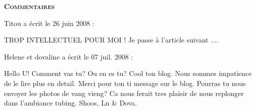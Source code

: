 \bigskip
\textbf{\textsc{Commentaires}}

 \medskip
Titou a écrit le 26 juin 2008 :
\begin{displayquote}
TROP INTELLECTUEL POUR MOI ! 
Je passe à l'article suivant ....
\end{displayquote}

 \medskip
Helene et dovaline a écrit le 07 juil. 2008 :
\begin{displayquote}
Hello U!
Comment vas tu? Ou en es tu?
Cool ton blog. Nous sommes impatience de le lire plus en detail.
Merci pour ton ti message sur le blog. 
Pourras tu nous envoyer les photos de vang vieng? Ca nous ferait tres plaisir de nous replonger dans l'ambiance tubing.
Shoos,
Ln & Dova.
\end{displayquote}

